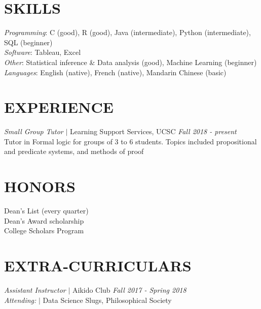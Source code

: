 \documentclass[margin]{res}
\begin{document}
\begin{resume}
\section{SKILLS} 
    {\sl Programming}: C (good), R (good), Java (intermediate), Python (intermediate), \\
    \hspace*{2ex}SQL (beginner) \\
    {\sl Software}: Tableau, Excel\\
    {\sl Other}: Statistical inference \& Data analysis (good), Machine Learning (beginner)\\
    {\sl Languages}: English (native), French (native), Mandarin Chinese (basic) \\
 
\section{EXPERIENCE} 
	{\sl Small Group Tutor} $\mid$ Learning Support Services, UCSC \hfill {\sl Fall 2018 - present}\\
	Tutor in Formal logic for groups of 3 to 6 students. Topics included propositional and predicate systems, and methods of proof
   

\section{HONORS}   
    Dean's List (every quarter)\\
    Dean's Award scholarship \\ 
    College Scholars Program

\section{EXTRA-CURRICULARS}             
    {\sl Assistant Instructor} $\mid$ Aikido Club \hfill {\sl Fall 2017 - Spring 2018} \\
    {\sl Attending:} $\mid$ Data Science Slugs, Philosophical Society


\end{resume}
\end{document}
